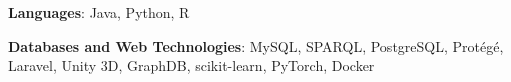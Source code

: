 \begin{cventries}
\cventry
{}
{}
{}
{}
{
 \begin{cvitems}
 \item {\textbf{Languages}: Java, Python, R}
 \item {\textbf{Databases and Web Technologies}: MySQL, SPARQL, PostgreSQL, Protégé, Laravel, Unity 3D, GraphDB, scikit-learn, PyTorch, Docker}
 \end{cvitems}
 }
\end{cventries}

